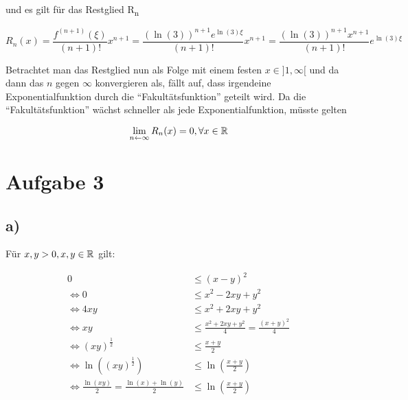 \documentclass[a4paper, 11pt]{article}
\begin{document}
und es gilt für das Restglied R\textsubscript{n}

\begin{equation*}
    R_n(x) = \frac{f^{(n+1)}(\xi)}{(n+1)!}x^{n+1}
        = \frac{ (\ln(3))^{n+1} e^{\ln(3)\xi}}{(n+1)!}x^{n+1}
        = \frac{ (\ln(3))^{n+1} x^{n+1}}{(n+1)!} e^{\ln(3)\xi}
\end{equation*}

Betrachtet man das Restglied nun als Folge mit einem festen \(x \in ]1, \infty[\)
und da dann das \(n\) gegen \(\infty\) konvergieren als, fällt auf, dass irgendeine
Exponentialfunktion durch die "`Fakultätsfunktion"' geteilt wird. Da die "`Fakultätsfunktion"' wächst
schneller als jede Exponentialfunktion, müsste gelten

\begin{equation*}
    \lim_{n \leftarrow \infty} R_n(x) = 0, \forall x \in \mathbb{R}
\end{equation*}

\section{Aufgabe 3}
\label{sec:orgc03ee14}
\subsection{a)}
\label{sec:org5e594e7}
Für \(x,y > 0, x,y \in \mathbb{R}\) gilt:

\begin{align*}
    0 &\leq (x-y)^2 \\
    \Leftrightarrow 0 &\leq x^2 -2xy+y^2 \\
    \Leftrightarrow 4xy &\leq x^2 + 2xy + y^2 \\
    \Leftrightarrow xy &\leq \frac{x^2+2xy+y^2}{4} = \frac{(x+y)^2}{4} \\
    \Leftrightarrow (xy)^{\frac{1}{2}} &\leq \frac{x+y}{2} \\
    \Leftrightarrow \ln((xy)^{\frac{1}{2}}) &\leq \ln\left(\frac{x+y}{2}\right) \\
    \Leftrightarrow \frac{\ln(xy)}{2} = \frac{\ln(x) + \ln(y)}{2} &\leq \ln\left(\frac{x+y}{2}\right)
\end{align*}
\end{document}
